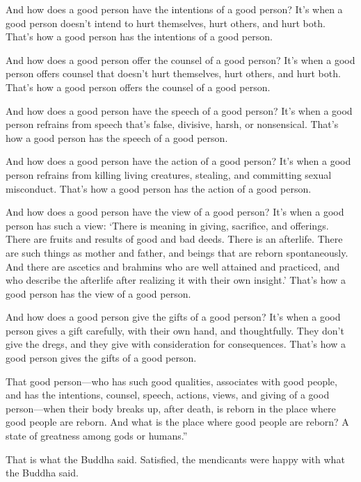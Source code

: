 \documentclass[12pt,openany]{book}%
\let\oldcontentsline\contentsline
\newcommand{\nopagecontentsline}[3]{\oldcontentsline{#1}{#2}{}}
\begin{document}
And how does a good person have the intentions of a good person? It’s when a good person doesn’t intend to hurt themselves, hurt others, and hurt both. That’s how a good person has the intentions of a good person. 

And how does a good person offer the counsel of a good person? It’s when a good person offers counsel that doesn’t hurt themselves, hurt others, and hurt both. That’s how a good person offers the counsel of a good person. 

And how does a good person have the speech of a good person? It’s when a good person refrains from speech that’s false, divisive, harsh, or nonsensical. That’s how a good person has the speech of a good person. 

And how does a good person have the action of a good person? It’s when a good person refrains from killing living creatures, stealing, and committing sexual misconduct. That’s how a good person has the action of a good person. 

And how does a good person have the view of a good person? It’s when a good person has such a view: ‘There is meaning in giving, sacrifice, and offerings. There are fruits and results of good and bad deeds. There is an afterlife. There are such things as mother and father, and beings that are reborn spontaneously. And there are ascetics and brahmins who are well attained and practiced, and who describe the afterlife after realizing it with their own insight.’ That’s how a good person has the view of a good person. 

And how does a good person give the gifts of a good person? It’s when a good person gives a gift carefully, with their own hand, and thoughtfully. They don’t give the dregs, and they give with consideration for consequences. That’s how a good person gives the gifts of a good person. 

That good person—who has such good qualities, associates with good people, and has the intentions, counsel, speech, actions, views, and giving of a good person—when their body breaks up, after death, is reborn in the place where good people are reborn. And what is the place where good people are reborn? A state of greatness among gods or humans.” 

That is what the Buddha said. Satisfied, the mendicants were happy with what the Buddha said. 

%
\end{document}
